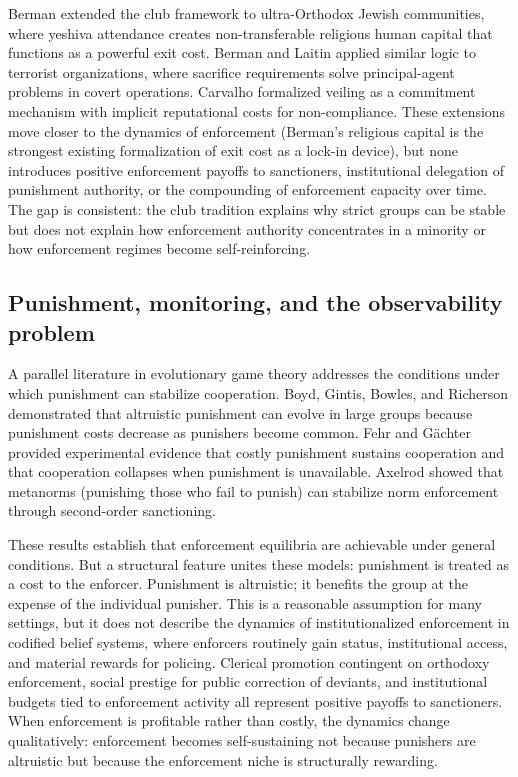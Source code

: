 \documentclass[12pt]{article}
\begin{document}
Berman \cite{berman2000} extended the club framework to ultra-Orthodox Jewish communities, where yeshiva attendance creates non-transferable religious human capital that functions as a powerful exit cost. Berman and Laitin \cite{berman2008} applied similar logic to terrorist organizations, where sacrifice requirements solve principal-agent problems in covert operations. Carvalho \cite{carvalho2013} formalized veiling as a commitment mechanism with implicit reputational costs for non-compliance. These extensions move closer to the dynamics of enforcement (Berman's religious capital is the strongest existing formalization of exit cost as a lock-in device), but none introduces positive enforcement payoffs to sanctioners, institutional delegation of punishment authority, or the compounding of enforcement capacity over time. The gap is consistent: the club tradition explains why strict groups can be stable but does not explain how enforcement authority concentrates in a minority or how enforcement regimes become self-reinforcing.

\subsection{Punishment, monitoring, and the observability problem}

A parallel literature in evolutionary game theory addresses the conditions under which punishment can stabilize cooperation. Boyd, Gintis, Bowles, and Richerson \cite{boyd2003} demonstrated that altruistic punishment can evolve in large groups because punishment costs decrease as punishers become common. Fehr and G\"{a}chter \cite{fehr2000,fehr2002} provided experimental evidence that costly punishment sustains cooperation and that cooperation collapses when punishment is unavailable. Axelrod \cite{axelrod1986} showed that metanorms (punishing those who fail to punish) can stabilize norm enforcement through second-order sanctioning.

These results establish that enforcement equilibria are achievable under general conditions. But a structural feature unites these models: punishment is treated as a cost to the enforcer. Punishment is altruistic; it benefits the group at the expense of the individual punisher. This is a reasonable assumption for many settings, but it does not describe the dynamics of institutionalized enforcement in codified belief systems, where enforcers routinely gain status, institutional access, and material rewards for policing. Clerical promotion contingent on orthodoxy enforcement, social prestige for public correction of deviants, and institutional budgets tied to enforcement activity all represent positive payoffs to sanctioners. When enforcement is profitable rather than costly, the dynamics change qualitatively: enforcement becomes self-sustaining not because punishers are altruistic but because the enforcement niche is structurally rewarding.
\end{document}
